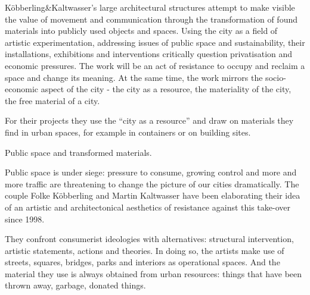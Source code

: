 Köbberling\&Kaltwasser’s large architectural structures attempt to make visible the value of movement and communication through the transformation of found materials into publicly used objects and spaces. Using the city as a field of artistic experimentation, addressing issues of public space and sustainability, their installations, exhibitions and interventions critically question privatisation and economic pressures. The work will be an act of resistance to occupy and reclaim a space and change its meaning. At the same time, the work mirrors the socio-economic aspect of the city - the city as a resource, the materiality of the city, the free material of a city. 

For their projects they use the “city as a resource” and draw on materials they find in urban spaces, for example in containers or on building sites.

Public space and transformed materials. 

Public space is under siege: pressure to consume, growing control and more and more traffic are threatening to change the picture of our cities dramatically. The couple Folke Köbberling and Martin Kaltwasser have been elaborating their idea of an artistic and architectonical aesthetics of resistance against this take-over since 1998.

They confront consumerist ideologies with alternatives: structural intervention, artistic statements, actions and theories. In doing so, the artists make use of streets, squares, bridges, parks and interiors as operational spaces. And the material they use is always obtained from urban resources: things that have been thrown away, garbage, donated things.





%





